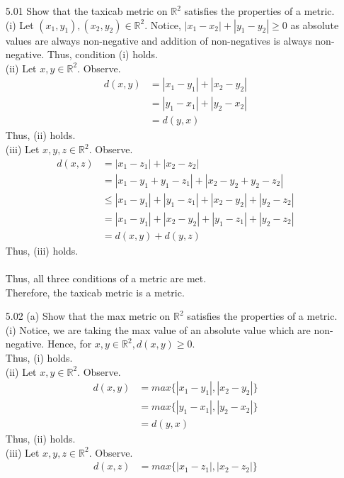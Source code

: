 \documentclass[12pt]{article}
\newcommand{\R}{\mathbb{R}}
\newcommand{\1}{^{-1}}
\begin{document}
\begin{enumerate}
		
	\item[5.01] Show that the taxicab metric on $\mathbb{R}^{2}$ satisfies the properties of a metric.\\
		(i) Let $ (x_1,y_1),(x_2,y_2)\in \R^2 $. Notice, $ |x_1-x_2| + |y_1 - y_2| \geq 0$ as absolute values are always non-negative and addition of non-negatives is always non-negative.
	Thus, condition (i) holds.\\
	 (ii) Let $ x,y\in \R^2 $. Observe.
		\begin{align*}
			d(x,y) &= |x_1-y_1|+|x_2-y_2|\\
					&= |y_1-x_1|+|y_2-x_2|\\
					&= d(y,x)
		\end{align*}
	Thus, (ii) holds.\\
	(iii) Let $ x,y,z \in \R^2 $. Observe.
	\begin{align*}
		d(x,z) &= |x_1-z_1|+|x_2-z_2|\\
				&= |x_1-y_1+y_1-z_1|+|x_2-y_2+y_2-z_2|\\
				&\leq |x_1-y_1|+|y_1-z_1|+|x_2-y_2|+|y_2-z_2|\\
				&=    |x_1-y_1|+|x_2-y_2|+|y_1-z_1|+|y_2-z_2|\\
				&= d(x,y)+d(y,z)
	\end{align*}
	Thus, (iii) holds.\\
	\\
	Thus, all three conditions of a metric are met.\\
	Therefore, the taxicab metric is a metric.
	\item[5.02] (a) Show that the max metric on $\mathbb{R}^{2}$ satisfies the properties of a metric.\\
	(i) Notice, we are taking the max value of an absolute value which are non-negative. Hence, for $ x,y\in \R^2 , d(x,y)\geq 0$. \\ 
	Thus, (i) holds.\\
	(ii) Let $ x,y\in \R^2 $. Observe.
	\begin{align*}
		d(x,y) &= max\{|x_1-y_1|,|x_2-y_2|\}\\
				&= max\{|y_1-x_1|,|y_2-x_2|\}\\
				&= d(y,x)
	\end{align*}
	Thus, (ii) holds.\\
	(iii) Let $ x,y,z \in \R^2 $. Observe.
	\begin{align*}
		d(x,z)  &= max\{|x_1-z_1|,|x_2-z_2|\}\\

\end{align*}
\end{enumerate}
\end{document}
